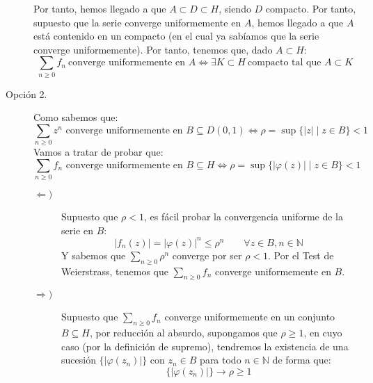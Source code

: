 \begin{ejercicio}
\begin{description}
                Por tanto, hemos llegado a que $A\subset D\subset H$, siendo $D$ compacto. Por tanto, supuesto que la serie converge uniformemente en $A$, hemos llegado a que $A$ está contenido en un compacto (en el cual ya sabíamos que la serie converge uniformemente). Por tanto, tenemos que, dado $A\subset H$:
                \begin{equation*}
                    \sum_{n \geq 0} f_n\ \text{converge uniformemente en } A\iff \exists K\subset H\ \text{compacto tal que } A\subset K
                \end{equation*}
            \item [Opción 2.] Como sabemos que:
                \begin{equation*}
                    \sum_{n\geq 0} z^n \text{\ converge uniformemente en\ } B\subseteq D(0,1) \Longleftrightarrow \rho = \sup\{|z| \mid z\in B\} < 1
                \end{equation*}
                Vamos a tratar de probar que:
                \begin{equation*}
                    \sum_{n\geq 0} f_n \text{\ converge uniformemente en\ } B \subseteq H \Longleftrightarrow \rho = \sup\{|\varphi(z)| \mid z\in B\} < 1
                \end{equation*}
                \begin{description}
                    \item [$\Longleftarrow)$] Supuesto que $\rho < 1$, es fácil probar la convergencia uniforme de la serie en $B$:
                        \begin{equation*}
                            |f_n(z)| = {|\varphi(z)|}^{n} \leq \rho^n \qquad \forall z\in B, n\in \mathbb{N}
                        \end{equation*}
                        Y sabemos que $\sum\limits_{n\geq 0}\rho^n$ converge por ser $\rho < 1$. Por el Test de Weierstrass, tenemos que $\sum\limits_{n\geq 0}f_n$ converge uniformemente en $B$.
                    \item [$\Longrightarrow)$] Supuesto que $\sum\limits_{n\geq 0}f_n$ converge uniformemente en un conjunto $B\subseteq H$, por reducción al absurdo, supongamos que $\rho \geq 1$, en cuyo caso (por la definición de supremo), tendremos la existencia de una sucesión $\{|\varphi(z_n)|\}$ con $z_n \in B$ para todo $n\in \mathbb{N}$ de forma que:
                        \begin{equation*}
                            \{|\varphi(z_n)|\} \to \rho \geq 1
                        \end{equation*}

\end{description}
\end{description}
\end{ejercicio}
